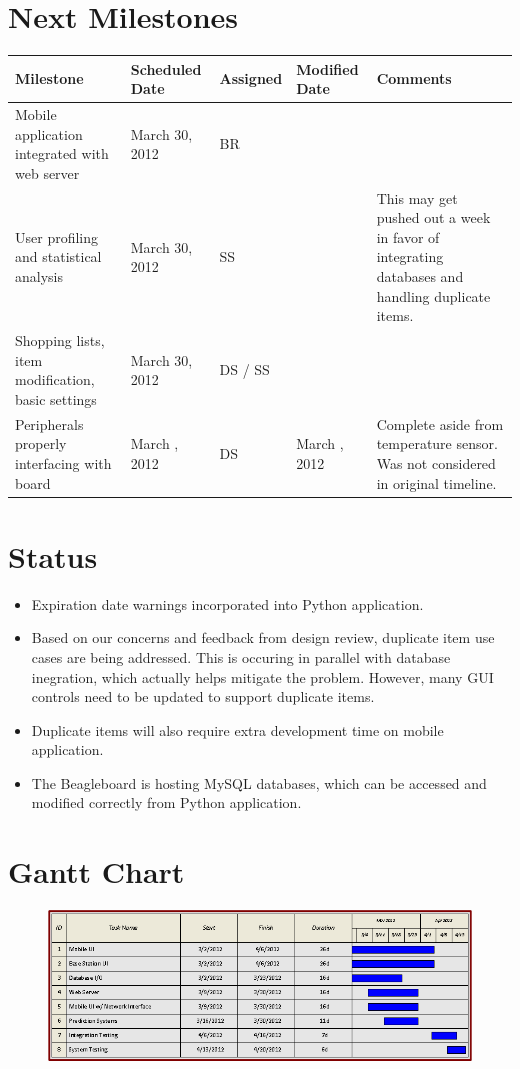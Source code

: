\documentclass[11pt,letterpaper]{article}
\begin{document}
\section{Next Milestones}
\begin{table}[h!]
\begin{center}
\begin{tabular}{| p{3.5 cm} | p{2 cm} | p{2 cm}| p{2 cm} | p{6 cm} | }
\hline
\textbf{Milestone} & \textbf{Scheduled Date} & \textbf{Assigned} & \textbf{Modified Date} & \textbf{Comments} \\
\hline
Mobile application integrated with web server & March 30, 2012 &BR & & \\
\hline
User profiling and statistical analysis & March 30, 2012 & SS & & This may get pushed out a week in favor of integrating databases and handling duplicate items.\\
\hline
Shopping lists, item modification, basic \newline settings & March 30, 2012 & DS / SS & &\\
\hline
Peripherals properly interfacing with \newline board & March \newline 02, 2012 & DS & March \newline 30, 2012 & Complete aside from temperature sensor. Was not considered in \newline original timeline. \\
\hline
\end{tabular}
\end{center}
\end{table}

\section{Status}
\begin{itemize}
\item Expiration date warnings incorporated into Python application.
\item Based on our concerns and feedback from design review, duplicate item use cases are being addressed. This is occuring in parallel with database inegration, which actually helps mitigate the problem. However, many GUI controls need to be updated to support duplicate items.
\item Duplicate items will also require extra development time on mobile application.
\item The Beagleboard is hosting MySQL databases, which can be accessed and modified correctly from Python application.
\end{itemize}

\section{Gantt Chart}
\begin{figure}[h!]
\begin{center}
\includegraphics[scale=.6]{GanttChartI}
\end{center}
\end{figure}
\end{document}
